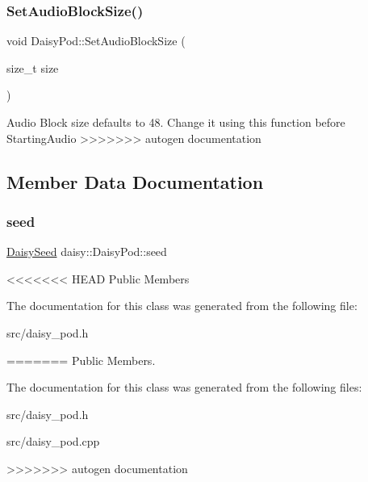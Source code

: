 \subsubsection{\texorpdfstring{Set\+Audio\+Block\+Size()}{SetAudioBlockSize()}}
{\footnotesize\ttfamily void Daisy\+Pod\+::\+Set\+Audio\+Block\+Size (\begin{DoxyParamCaption}\item[{size\+\_\+t}]{size }\end{DoxyParamCaption})}

Audio Block size defaults to 48. Change it using this function before Starting\+Audio 
>>>>>>> autogen documentation

\subsection{Member Data Documentation}
\mbox{\label{classdaisy_1_1_daisy_pod_a75907b96ea78262bf52dd7b565136f58}} 
\subsubsection{\texorpdfstring{seed}{seed}}
{\footnotesize\ttfamily \hyperlink{classdaisy_1_1_daisy_seed}{Daisy\+Seed} daisy\+::\+Daisy\+Pod\+::seed}

<<<<<<< HEAD
Public Members 

The documentation for this class was generated from the following file\+:\begin{DoxyCompactItemize}
\item 
src/daisy\+\_\+pod.\+h\end{DoxyCompactItemize}
=======
Public Members. 

The documentation for this class was generated from the following files\+:\begin{DoxyCompactItemize}
\item 
src/daisy\+\_\+pod.\+h\item 
src/daisy\+\_\+pod.\+cpp\end{DoxyCompactItemize}
>>>>>>> autogen documentation
